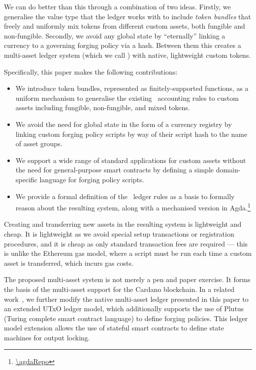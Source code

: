 We can do better than this through a combination of two ideas.
Firstly, we generalise the value type that the ledger works with to include \emph{token bundles} that freely and uniformly mix tokens from different custom assets, both fungible and non-fungible.
Secondly, we avoid any global state by ``eternally'' linking a currency to a governing forging policy via a hash.
Between them this creates a multi-asset ledger system (which we call \UTXOma) with native, lightweight custom tokens.

Specifically, this paper makes the following contributions:
%
\begin{itemize}
\item We introduce token bundles, represented as finitely-supported functions, as a uniform mechanism to generalise the existing \UTXO\ accounting rules to custom assets including fungible, non-fungible, and mixed tokens.
\item We avoid the need for global state in the form of a currency registry by linking custom forging policy scripts by way of their script hash to the name of asset groups.
\item We support a wide range of standard applications for custom assets without the need for general-purpose smart contracts by defining a simple domain-specific language for forging policy scripts.
\item We provide a formal definition of the \UTXOma\ ledger rules as a basis to formally reason about the resulting system, along with a mechanised version in Agda.\footnote{\url{\agdaRepo}}

\end{itemize}
%
Creating and transferring new assets in the resulting system is lightweight and cheap. It is lightweight as we avoid special setup transactions or registration procedures, and it is cheap as only standard transaction fees are required --- this is unlike the Ethereum gas model, where a script must
be run each time a custom asset is transferred, which incurs gas costs.

The proposed multi-asset system is not merely a pen and paper exercise. It forms the basis of the multi-asset support for the Cardano blockchain.
In a related work~\cite{eutxo-ma}, we further modify the native multi-asset ledger
presented in this paper to an extended UTxO ledger model, which additionally supports
the use of Plutus (Turing complete smart contract language) to define forging policies.
This ledger model extension allows the use of stateful smart contracts to define
state machines for output locking.
